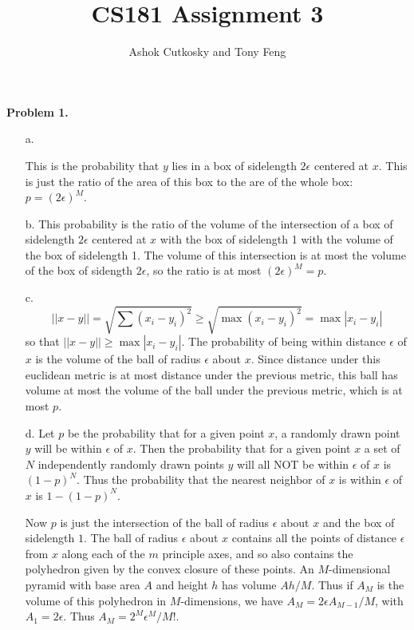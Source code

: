 \documentclass[12pt]{amsart}
\title{CS181 Assignment 3}
\author{Ashok Cutkosky and Tony Feng}
\theoremstyle{remark}
\begin{document}
\maketitle

\noindent \textbf{Problem 1.}
\begin{enumerate}

\item[a.]

This is the probability that $y$ lies in a box of sidelength $2\epsilon$ centered at $x$. This is just the ratio of the area of this box to the are of the whole box: $p=(2\epsilon)^M$.


\item[b.]
This probability is the ratio of the volume of the intersection of a box of sidelength $2\epsilon$ centered at $x$ with the box of sidelength 1 with the volume of the box of sidelength 1. The volume of this intersection is at most the volume of the box of sidength $2\epsilon$, so the ratio is at most $(2\epsilon)^M=p$.

\item[c.]
\[
||x-y||=\sqrt{\sum (x_i-y_i)^2}\ge \sqrt{\max (x_i-y_i)^2}=\max |x_i-y_i|
\]
so that $||x-y||\ge \max |x_i-y_i|$. The probability of being within distance $\epsilon$ of $x$ is the volume of the ball of radius $\epsilon$ about $x$. Since distance under this euclidean metric is at most distance under the previous metric, this ball has volume at most the volume of the ball under the previous metric, which is at most $p$.

\item[d.]
Let $p$ be the probability that for a given point $x$, a randomly drawn point $y$ will be within $\epsilon$ of $x$. Then the probability that for a given point $x$ a set of $N$ independently randomly drawn points $y$ will all NOT be within $\epsilon$ of $x$ is $(1-p)^N$. Thus the probability that the nearest neighbor of $x$ is within $\epsilon$ of $x$ is $1-(1-p)^N$.

Now $p$ is just the intersection of the ball of radius $\epsilon$ about $x$ and the box of sidelength $1$. The ball of radius $\epsilon$ about $x$ contains all the points of distance $\epsilon$ from $x$ along each of the $m$ principle axes, and so also contains the polyhedron given by the convex closure of these points. An $M$-dimensional pyramid with base area $A$ and height $h$ has volume $Ah/M$. Thus if $A_M$ is the volume of this polyhedron in $M$-dimensions, we have $A_M=2\epsilon A_{M-1}/M$, with $A_1=2\epsilon$. Thus $A_M=2^M\epsilon^M/M!$.


\end{enumerate}
\end{document}
